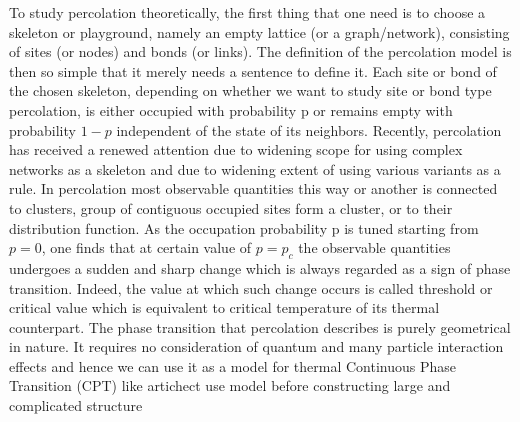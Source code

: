 To study percolation theoretically, the first thing that one need is to choose a skeleton or playground, namely an empty lattice (or a graph/network), consisting of sites (or nodes) and bonds (or links). The definition of the percolation model is then so simple that it merely needs a sentence to define it. Each site or bond of the chosen skeleton, depending on whether we want to study site or bond type percolation, is either occupied with probability p or remains empty with probability $1-p$ independent of the state of its neighbors. Recently, percolation has received a renewed attention due to widening scope for using complex networks as a skeleton and due to widening extent of using various variants as a rule. In percolation most observable quantities this way or another is connected to clusters, group of contiguous occupied sites form a cluster, or to their distribution function. As the occupation probability p is tuned starting from $p = 0$, one finds that at certain value of $p=p_c$ the observable quantities undergoes a sudden and sharp change which is always regarded as a sign of phase transition. Indeed, the value at which such change occurs is called threshold or critical value which is equivalent to critical temperature of its thermal counterpart. The phase transition that percolation describes
is purely geometrical in nature. It requires no consideration of quantum and many particle interaction effects and hence we can use it as a model for thermal Continuous Phase Transition (CPT) like artichect use model before constructing large and complicated structure

